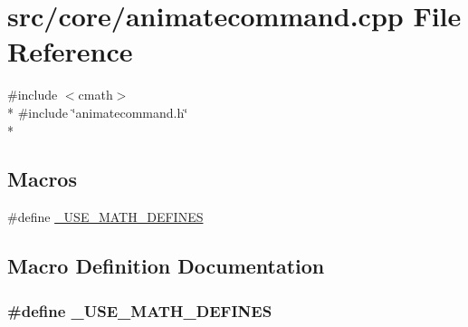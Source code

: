 \hypertarget{a00197}{\section{src/core/animatecommand.cpp File Reference}
\label{a00197}
}
{\ttfamily \#include $<$cmath$>$}\\*
{\ttfamily \#include \char`\"{}animatecommand.\-h\char`\"{}}\\*
\subsection*{Macros}
\begin{DoxyCompactItemize}
\item 
\#define \hyperlink{a00197_a525335710b53cb064ca56b936120431e}{\-\_\-\-U\-S\-E\-\_\-\-M\-A\-T\-H\-\_\-\-D\-E\-F\-I\-N\-E\-S}
\end{DoxyCompactItemize}


\subsection{Macro Definition Documentation}
\hypertarget{a00197_a525335710b53cb064ca56b936120431e}{
\subsubsection[{\-\_\-\-U\-S\-E\-\_\-\-M\-A\-T\-H\-\_\-\-D\-E\-F\-I\-N\-E\-S}]{\setlength{\rightskip}{0pt plus 5cm}\#define \-\_\-\-U\-S\-E\-\_\-\-M\-A\-T\-H\-\_\-\-D\-E\-F\-I\-N\-E\-S}}\label{a00197_a525335710b53cb064ca56b936120431e}
